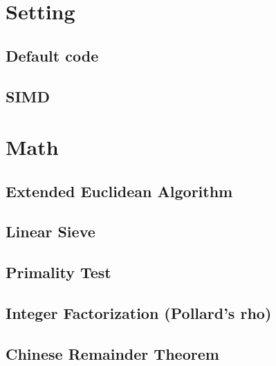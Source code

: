 \documentclass[9pt,landscape,a4paper,twocolumn]{extarticle}
\begin{document}
\tableofcontents


\section{Setting}

\subsection{Default code}


\subsection{SIMD}



\section{Math}

% 

\subsection{Extended Euclidean Algorithm}


\subsection{Linear Sieve}


\subsection{Primality Test}


\subsection{Integer Factorization (Pollard's rho)}


\subsection{Chinese Remainder Theorem}

\end{document}
